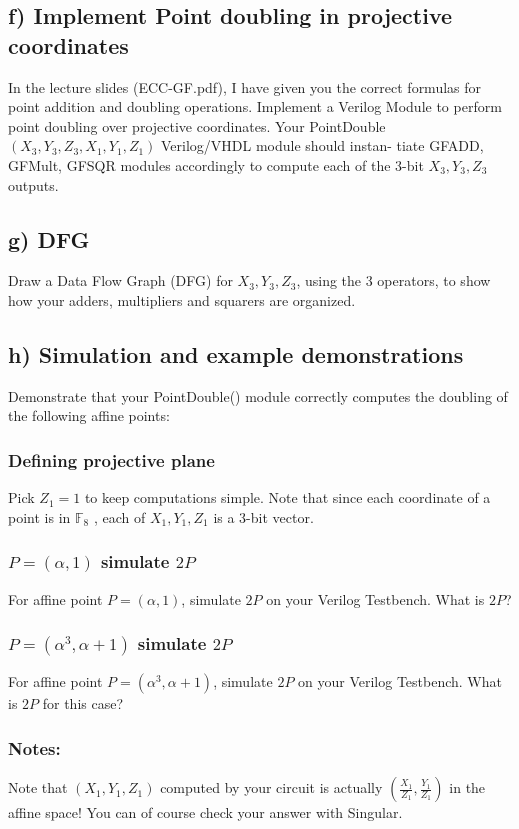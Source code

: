 \documentclass[a4paper,11pt]{exam}
\begin{document}
\subsection{f) Implement Point doubling in projective coordinates}
\label{sec:orga502d71}
In the lecture slides (ECC-GF.pdf), I have given you the correct formulas for point addition
and doubling operations. Implement a Verilog Module to perform point doubling over projective
coordinates. Your PointDouble\((X_3,Y_3,Z_3,X_1,Y_1,Z_1)\) Verilog/VHDL module should instan-
tiate GFADD, GFMult, GFSQR modules accordingly to compute each of the 3-bit \(X_3, Y_3, Z_3\)
outputs.

\subsection{g) DFG}
\label{sec:org967a100}
Draw a Data Flow Graph (DFG) for \(X_3, Y_3, Z_3\), using the 3 operators, to show how your
adders, multipliers and squarers are organized.

\subsection{h) Simulation and example demonstrations}
\label{sec:org1cb98af}
 Demonstrate that your PointDouble() module correctly computes the doubling of the
following affine points:

\subsubsection{Defining projective plane}
\label{sec:orgdea4bb2}
Pick \(Z_1 = 1\) to keep computations simple. Note that since each coordinate of a point is
in \(\mathbb{F}_8\) , each of \(X_1, Y_1, Z_1\) is a 3-bit vector.

\subsubsection{\(P = (\alpha, 1)\) simulate \(2P\)}
\label{sec:orge3960a3}
For affine point \(P = (\alpha, 1)\), simulate \(2P\) on your Verilog Testbench. What is \(2P\)?
\subsubsection{\(P = (\alpha^3, \alpha + 1)\) simulate \(2P\)}
\label{sec:orgddaddf8}
For affine point \(P = (\alpha^3, \alpha + 1)\), simulate \(2P\) on your Verilog Testbench. What is \(2P\) for
this case?
\subsubsection{Notes:}
\label{sec:org984f520}
Note that \((X_1 , Y_1 , Z_1 )\) computed by your circuit is actually \((\frac{X_1}{Z_1}, \frac{Y_1}{Z_1})\) in the affine
space! You can of course check your answer with Singular.
\end{document}
